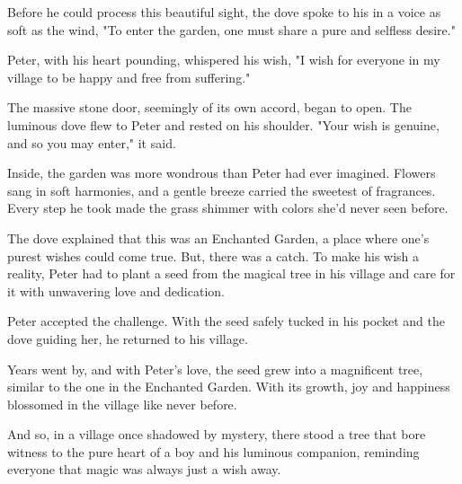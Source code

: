\documentclass[10pt, fullpage, a4paper, titlepage]{article}
\begin{document}
Before he could process this beautiful sight, the dove spoke to his in a voice as soft as the wind, "To enter the garden, one must share a pure and selfless desire."

Peter, with his heart pounding, whispered his wish, "I wish for everyone in my village to be happy and free from suffering."

The massive stone door, seemingly of its own accord, began to open. The luminous dove flew to Peter and rested on his shoulder. "Your wish is genuine, and so you may enter," it said.

Inside, the garden was more wondrous than Peter had ever imagined. Flowers sang in soft harmonies, and a gentle breeze carried the sweetest of fragrances. Every step he took made the grass shimmer with colors she'd never seen before.

The dove explained that this was an Enchanted Garden, a place where one’s purest wishes could come true. But, there was a catch. To make his wish a reality, Peter had to plant a seed from the magical tree in his village and care for it with unwavering love and dedication.

Peter accepted the challenge. With the seed safely tucked in his pocket and the dove guiding her, he returned to his village.

Years went by, and with Peter's love, the seed grew into a magnificent tree, similar to the one in the Enchanted Garden. With its growth, joy and happiness blossomed in the village like never before.

And so, in a village once shadowed by mystery, there stood a tree that bore witness to the pure heart of a boy and his luminous companion, reminding everyone that magic was always just a wish away.
\end{document}
